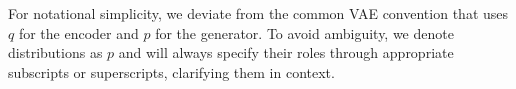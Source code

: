 For notational simplicity, we deviate from the common VAE convention that uses $q$ for the encoder and $p$ for the generator. To avoid ambiguity, we denote distributions as 
$p$ and will always specify their roles through appropriate subscripts or superscripts, clarifying them in context.










